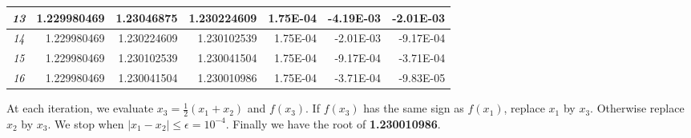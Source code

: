 \begin{exercise}{2}
\begin{table}[h]
\begin{tabular}{|c|r|r|r|r|r|r|}
\textit{13} & 1.229980469 & 1.23046875 & 1.230224609 & 1.75E-04 & -4.19E-03 & -2.01E-03 \\ \hline
\textit{14} & 1.229980469 & 1.230224609 & 1.230102539 & 1.75E-04 & -2.01E-03 & -9.17E-04 \\ \hline
\textit{15} & 1.229980469 & 1.230102539 & 1.230041504 & 1.75E-04 & -9.17E-04 & -3.71E-04 \\ \hline
\textit{16} & 1.229980469 & 1.230041504 & 1.230010986 & 1.75E-04 & -3.71E-04 & -9.83E-05 \\ \hline
\end{tabular}
\end{table}

At each iteration, we evaluate \(x_3 = \frac{1}{2}(x_1+x_2)\) and \(f(x_3)\). If \(f(x_3)\) has the same sign as \(f(x_1)\), replace \(x_1\) by \(x_3\). Otherwise replace \(x_2\) by \(x_3\).
We stop when \(|x_1-x_2| \leq \epsilon = 10^{-4}\).
Finally we have the root of \textbf{1.230010986}.
\end{exercise}

